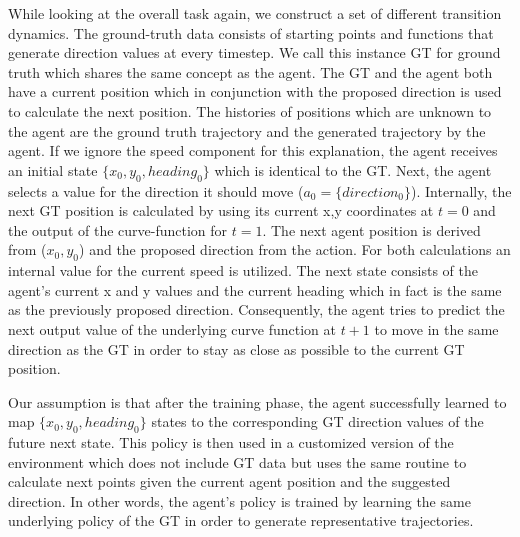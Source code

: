 While looking at the overall task again, we construct a set of different transition dynamics. The ground-truth data consists of starting points and functions that generate direction values at every timestep. We call this instance GT for ground truth which shares the same concept as the agent. The GT and the agent both have a current position which in conjunction with the proposed direction is used to calculate the next position. The histories of positions which are unknown to the agent are the ground truth trajectory and the generated trajectory by the agent. If we ignore the speed component for this explanation, the agent receives an initial state $\{x_0,y_0,heading_0\}$ which is identical to the GT. Next, the agent selects a value for the direction it should move ($a_0=\{direction_0\}$). Internally, the next GT position is calculated by using its current x,y coordinates at $t=0$ and the output of the curve-function for $t=1$. The next agent position is derived from ($x_0, y_0$) and the proposed direction from the action. For both calculations an internal value for the current speed is utilized. The next state consists of the agent's current x and y values and the current heading which in fact is the same as the previously proposed direction. Consequently, the agent tries to predict the next output value of the underlying curve function at $t+1$ to move in the same direction as the GT in order to stay as close as possible to the current GT position.
\par
Our assumption is that after the training phase, the agent successfully learned to map $\{x_0,y_0,heading_0\}$ states to the corresponding GT direction values of the future next state. This policy is then used in a customized version of the environment which does not include GT data but uses the same routine to calculate next points given the current agent position and the suggested direction. In other words, the agent's policy is trained by learning the same underlying policy of the GT in order to generate representative trajectories.
\par
